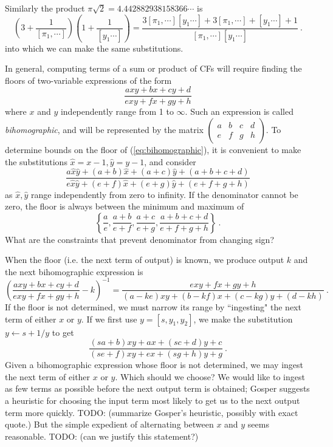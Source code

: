 \documentclass[11pt, oneside]{amsart}   	%
\newcommand{\abcd}{\left(
\begin{smallmatrix} 
a & b & c & d\\ 
e & f & g & h
\end{smallmatrix}
\right)}
\begin{document}
Similarly the product $\pi\sqrt{2}=4.442882938158366\cdots$ is
\begin{equation}\label{eq:cfMult}
(3 + \frac{1}{[\pi_1,\cdots]})(1 + \frac{1}{[y_1\cdots]}) 
  = \frac{ 3[\pi_1,\cdots][y_1\cdots] + 3[\pi_1,\cdots] + [y_1\cdots] +1 }{[\pi_1,\cdots][y_1\cdots] }\ .
\end{equation}
into which we can make the same substitutions. 

In general, computing terms of a sum or product of CFs will require finding the floors of two-variable expressions of the form
\begin{equation}\label{eq:bihomographic}
\frac{axy + bx + cy + d}{exy + fx + gy + h}
\end{equation}
where $x$ and $y$ independently range from 1 to $\infty$. Such an expression is called \emph{bihomographic}, and will be represented by the matrix $\abcd$. To determine bounds on the floor of (\ref{eq:bihomographic}), it is convenient to make the substitutions $\hat{x} = x-1, \hat{y} = y-1$, and consider
\[
\frac{a\hat{x}\hat{y} + (a+b)\hat{x} + (a+c)\hat{y} + (a+b+c+d)}{e\hat{x}\hat{y} + (e+f)\hat{x} + (e+g)\hat{y} + (e+f+g+h)}
\]
as $\hat{x}, \hat{y}$ range independently from zero to infinity. If the denominator cannot be zero, the floor is always between the minimum and maximum of
\[
\left\{ \frac{a}{e},\frac{a+b}{e+f},\frac{a+c}{e+g},\frac{a+b+c+d}{e+f+g+h} \right\}\ .
\]
What are the constraints that prevent denominator from changing sign?

When the floor (i.e. the next term of output) is known, we produce output $k$ and the next bihomographic expression is
\[
\left(\frac{axy + bx + cy + d}{exy + fx + gy + h} - k\right)^{-1} = \frac{exy + fx + gy + h}{(a-ke)xy + (b-kf)x + (c-kg)y + (d-kh)}\ .
\]
If the floor is not determined, we must narrow its range by ``ingesting" the next term of either $x$ or $y$. If we first use $y = [s,y_1,y_2]$, we make the substitution $y \leftarrow s + 1/y$ to get
\[
\frac{(sa+b)xy + ax + (sc+d)y + c}{(se+f)xy + ex + (sg+h)y + g}\ .
\]
Given a bihomographic expression whose floor is not determined, we may ingest the next term of either $x$ or $y$. Which should we choose? We would like to ingest as few terms as possible before the next output term is obtained; Gosper suggests a heuristic for choosing the input term most likely to get us to the next output term more quickly.
TODO: (summarize Gosper's heuristic, possibly with exact quote.) 
But the simple expedient of alternating between $x$ and $y$ seems reasonable.
TODO: (can we justify this statement?)
\end{document}
